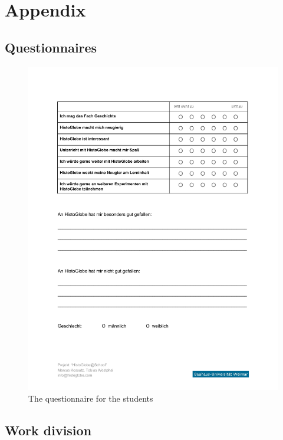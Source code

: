\section*{Appendix}

\subsection*{Questionnaires} %
\label{ssub:questionnaires}

\begin{figure}[H]
  \begin{center}
    \includegraphics[width=1.0\textwidth]{graphics/questionnaire.pdf}
  \end{center}
  \caption{The questionnaire for the students}
  \label{fig:questionnaire}
\end{figure}


\subsection*{Work division}

